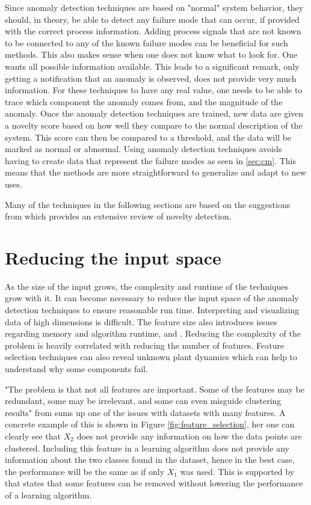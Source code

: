     Since anomaly detection techniques are based on "normal" system behavior, they should, in theory, be able to detect any failure mode that can occur, if provided with the correct process information. Adding process signals that are not known to be connected to any of the known failure modes can be beneficial for such methods. This also makes sense when one does not know what to look for. One wants all possible information available. This leads to a significant remark, only getting a notification that an anomaly is observed, does not provide very much information. For these techniques to have any real value, one needs to be able to trace which component the anomaly comes from, and the magnitude of the anomaly. Once the anomaly detection techniques are trained, new data are given a novelty score based on how well they compare to the normal description of the system. This score can then be compared to a threshold, and the data will be marked as normal or abnormal. Using anomaly detection techniques avoids having to create data that represent the failure modes as seen in \ref{sec:cm}. This means that the methods are more straightforward to generalize and adapt to new uses. 

    Many of the techniques in the following sections are based on the suggestions from \cite{Pimentel2014} which provides an extensive review of novelty detection. 

\section{Reducing the input space}\label{sec:reduce_features}
    As the size of the input grows, the complexity and runtime of the techniques grow with it. It can become necessary to reduce the input space of the anomaly detection techniques to ensure reasonable run time. Interpreting and visualizing data of high dimensions is difficult. The feature size also introduces issues regarding memory and algorithm runtime, \cite{Guyon2003} and \cite{Dy2004}. Reducing the complexity of the problem is heavily correlated with reducing the number of features. Feature selection techniques can also reveal unknown plant dynamics which can help to understand why some components fail.
    
    "The problem is that not all features are important. Some of the features may be redundant, some may be irrelevant, and some can even misguide clustering results" from \cite{Dy2004} sums up one of the issues with datasets with many features. A concrete example of this is shown in Figure \ref{fig:feature_selection}, her one can clearly see that $X_2$ does not provide any information on how the data points are clustered. Including this feature in a learning algorithm does not provide any information about the two classes found in the dataset, hence in the best case, the performance will be the same as if only $X_1$ was used. This is supported by \cite{Liu2010} that states that some features can be removed without lowering the performance of a learning algorithm.
    
